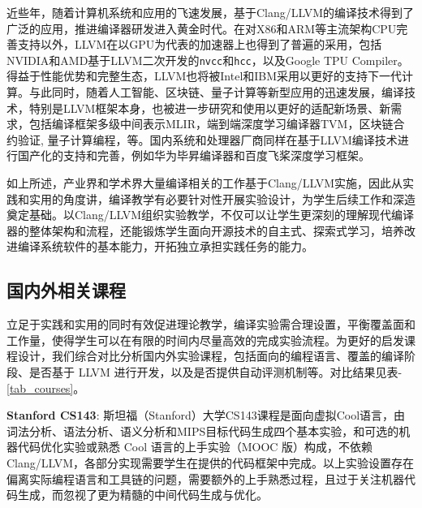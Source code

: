 \documentclass{SCIS2020cn}
\begin{document}
近些年，随着计算机系统和应用的飞速发展，基于Clang/LLVM的编译技术得到了广泛的应用，推进编译器研发进入黄金时代\cite{chris21_golden}。在对X86和ARM等主流架构CPU完善支持以外，LLVM在以GPU为代表的加速器上也得到了普遍的采用，包括NVIDIA和AMD基于LLVM二次开发的\texttt{nvcc}\cite{nv_c}和\texttt{hcc}\cite{olcf19_c}，以及Google TPU Compiler\cite{tpu_c}。得益于性能优势和完整生态，LLVM也将被Intel和IBM采用以更好的支持下一代计算\cite{intel21_c, ibm20_c}。与此同时，随着人工智能、区块链、量子计算等新型应用的迅速发展，编译技术，特别是LLVM框架本身，也被进一步研究和使用以更好的适配新场景、新需求，包括编译框架多级中间表示MLIR\cite{mlir}，端到端深度学习编译器TVM\cite{tvm21_c}，区块链合约验证\cite{zhong18_blockchain, ndss18_zeus}, 量子计算编程\cite{ms20_qir, arxiv22_qc}，等。国内系统和处理器厂商同样在基于LLVM编译技术进行国产化的支持和完善，例如华为毕昇编译器\cite{huawei_c}和百度飞桨深度学习框架\cite{baidu_c}。

如上所述，产业界和学术界大量编译相关的工作基于Clang/LLVM实施，因此从实践和实用的角度讲，编译教学有必要针对性开展实验设计，为学生后续工作和深造奠定基础。以Clang/LLVM组织实验教学，不仅可以让学生更深刻的理解现代编译器的整体架构和流程，还能锻炼学生面向开源技术的自主式、探索式学习，培养改进编译系统软件的基本能力，开拓独立承担实践任务的能力。

\subsection{国内外相关课程}
立足于实践和实用的同时有效促进理论教学，编译实验需合理设置，平衡覆盖面和工作量，使得学生可以在有限的时间内尽量高效的完成实验流程。为更好的启发课程设计，我们综合对比分析国内外实验课程，包括面向的编程语言、覆盖的编译阶段、是否基于 LLVM 进行开发，以及是否提供自动评测机制等。对比结果见表-\ref{tab_courses}。

\textbf{Stanford CS143}: 斯坦福（Stanford）大学CS143课程是面向虚拟Cool语言，由词法分析、语法分析、语义分析和MIPS目标代码生成四个基本实验，和可选的机器代码优化实验或熟悉 Cool 语言的上手实验（MOOC 版）构成，不依赖 Clang/LLVM，各部分实现需要学生在提供的代码框架中完成。以上实验设置存在偏离实际编程语言和工具链的问题，需要额外的上手熟悉过程，且过于关注机器代码生成，而忽视了更为精髓的中间代码生成与优化。
\end{document}
